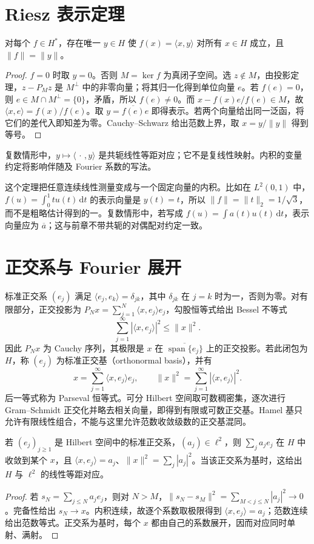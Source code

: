 \section{Riesz 表示定理}
\begin{theorem}\label{thm:fa-riesz-representation}
对每个 $f\in H^*$，存在唯一 $y\in H$ 使 $f(x)=\langle x,y\rangle$ 对所有 $x\in H$ 成立，且 $\|f\|=\|y\|$。
\end{theorem}
\begin{proof}
$f=0$ 时取 $y=0$。否则 $M=\ker f$ 为真闭子空间。选 $z\notin M$，由投影定理，$z-P_Mz$ 是 $M^\perp$ 中的非零向量；将其归一化得到单位向量 $e$。若 $f(e)=0$，则 $e\in M\cap M^\perp=\{0\}$，矛盾，所以 $f(e)\ne0$。而 $x-f(x)e/f(e)\in M$，故 $\langle x,e\rangle=f(x)/f(e)$。取 $y=\overline{f(e)}e$ 即得表示。若两个向量给出同一泛函，将它们的差代入即知差为零。Cauchy--Schwarz 给出范数上界，取 $x=y/\|y\|$ 得到等号。
\end{proof}
复数情形中，$y\mapsto\langle\,\cdot\,,y\rangle$ 是共轭线性等距对应；它不是复线性映射。内积的变量约定将影响伴随及 Fourier 系数的写法。

这个定理把任意连续线性测量变成与一个固定向量的内积。比如在 $L^2(0,1)$ 中，$f(u)=\int_0^1t u(t)\,\mathrm dt$ 的表示向量是 $y(t)=t$，所以 $\|f\|=\|t\|_2=1/\sqrt3$，而不是粗略估计得到的一。复数情形中，若写成 $f(u)=\int a(t)u(t)\,\mathrm dt$，表示向量应为 $\overline a$；这与前章不带共轭的对偶配对约定一致。

\section{正交系与 Fourier 展开}
标准正交系 $(e_j)$ 满足 $\langle e_j,e_k\rangle=\delta_{jk}$，其中 $\delta_{jk}$ 在 $j=k$ 时为一，否则为零。对有限部分，正交投影为 $P_Nx=\sum_{j=1}^N\langle x,e_j\rangle e_j$，勾股恒等式给出 Bessel 不等式
\[
 \sum_{j=1}^{\infty}|\langle x,e_j\rangle|^2\leq\|x\|^2.
\]
因此 $P_Nx$ 为 Cauchy 序列，其极限是 $x$ 在 $\overline{\operatorname{span}\{e_j\}}$ 上的正交投影。若此闭包为 $H$，称 $(e_j)$ 为标准正交基（orthonormal basis），并有
\begin{equation}
 x=\sum_{j=1}^{\infty}\langle x,e_j\rangle e_j,
 \qquad \|x\|^2=\sum_{j=1}^{\infty}|\langle x,e_j\rangle|^2.
 \label{eq:fa-parseval}
\end{equation}
后一等式称为 Parseval 恒等式。可分 Hilbert 空间取可数稠密集，逐次进行 Gram--Schmidt 正交化并略去相关向量，即得到有限或可数正交基。Hamel 基只允许有限线性组合，不能与这里允许范数收敛级数的正交基混同。

\begin{proposition}[平方可和系数与向量的对应]\label{prop:fa-riesz-fischer}
若 $(e_j)_{j\geq1}$ 是 Hilbert 空间中的标准正交系，$(a_j)\in\ell^2$，则 $\sum_ja_je_j$ 在 $H$ 中收敛到某个 $x$，且 $\langle x,e_j\rangle=a_j$、$\|x\|^2=\sum_j|a_j|^2$。当该正交系为基时，这给出 $H$ 与 $\ell^2$ 的线性等距对应。
\end{proposition}
\begin{proof}
若 $s_N=\sum_{j\leq N}a_je_j$，则对 $N>M$，$\|s_N-s_M\|^2=\sum_{M<j\leq N}|a_j|^2\to0$。完备性给出 $s_N\to x$。内积连续，故逐个系数取极限得到 $\langle x,e_j\rangle=a_j$；范数连续给出范数等式。正交系为基时，每个 $x$ 都由自己的系数展开，因而对应同时单射、满射。
\end{proof}

